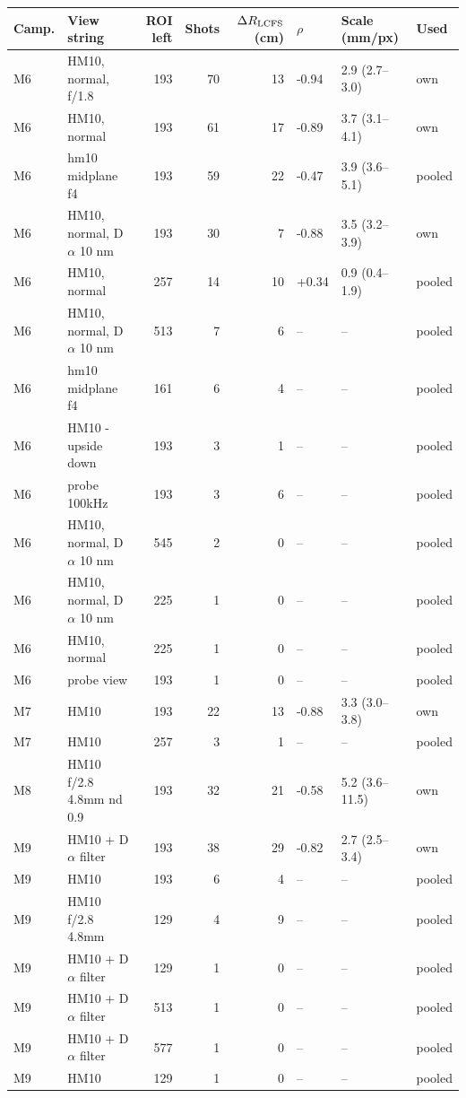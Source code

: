 \setlength{\tabcolsep}{4pt}\begin{tabular}{llrrrlll}
\toprule
Camp. & View string & ROI left & Shots & $\Delta R_{\rm LCFS}$ (cm) & $\rho$ & Scale (mm/px) & Used \\
\midrule
M6 & HM10, normal, f/1.8 & 193 & 70 & 13 & -0.94 & 2.9 (2.7--3.0) & own \\
M6 & HM10, normal & 193 & 61 & 17 & -0.89 & 3.7 (3.1--4.1) & own \\
M6 & hm10 midplane f4 & 193 & 59 & 22 & -0.47 & 3.9 (3.6--5.1) & pooled \\
M6 & HM10, normal, D$\alpha$ 10 nm & 193 & 30 & 7 & -0.88 & 3.5 (3.2--3.9) & own \\
M6 & HM10, normal & 257 & 14 & 10 & +0.34 & 0.9 (0.4--1.9) & pooled \\
M6 & HM10, normal, D$\alpha$ 10 nm & 513 & 7 & 6 & -- & -- & pooled \\
M6 & hm10 midplane f4 & 161 & 6 & 4 & -- & -- & pooled \\
M6 & HM10 - upside down & 193 & 3 & 1 & -- & -- & pooled \\
M6 & probe 100kHz & 193 & 3 & 6 & -- & -- & pooled \\
M6 & HM10, normal, D$\alpha$ 10 nm & 545 & 2 & 0 & -- & -- & pooled \\
M6 & HM10, normal, D$\alpha$ 10 nm & 225 & 1 & 0 & -- & -- & pooled \\
M6 & HM10, normal & 225 & 1 & 0 & -- & -- & pooled \\
M6 & probe view & 193 & 1 & 0 & -- & -- & pooled \\
M7 & HM10 & 193 & 22 & 13 & -0.88 & 3.3 (3.0--3.8) & own \\
M7 & HM10 & 257 & 3 & 1 & -- & -- & pooled \\
M8 & HM10 f/2.8 4.8mm nd 0.9 & 193 & 32 & 21 & -0.58 & 5.2 (3.6--11.5) & own \\
M9 & HM10 + D$\alpha$ filter & 193 & 38 & 29 & -0.82 & 2.7 (2.5--3.4) & own \\
M9 & HM10 & 193 & 6 & 4 & -- & -- & pooled \\
M9 & HM10 f/2.8 4.8mm & 129 & 4 & 9 & -- & -- & pooled \\
M9 & HM10 + D$\alpha$ filter & 129 & 1 & 0 & -- & -- & pooled \\
M9 & HM10 + D$\alpha$ filter & 513 & 1 & 0 & -- & -- & pooled \\
M9 & HM10 + D$\alpha$ filter & 577 & 1 & 0 & -- & -- & pooled \\
M9 & HM10 & 129 & 1 & 0 & -- & -- & pooled \\
\bottomrule
\end{tabular}
